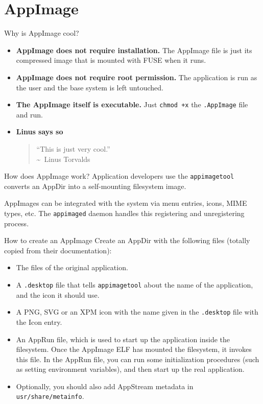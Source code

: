 \documentclass{lug}
\begin{document}
\section{AppImage}
\begin{frame}{Why is AppImage cool?}
    \begin{itemize}
        \item \textbf{AppImage does not require installation.} The AppImage file
            is just its compressed image that is mounted with FUSE when it runs.
        \item \textbf{AppImage does not require root permission.} The
            application is run as the user and the base system is left
            untouched.
        \item \textbf{The AppImage itself is executable.} Just \texttt{chmod +x}
            the \texttt{.AppImage} file and run.
        \item \textbf{Linus says so}
            \begin{quote}
                ``This is just very cool.''\\
                \hspace*{0.5in}\textasciitilde\ Linus Torvalds
            \end{quote}
    \end{itemize}
\end{frame}

\begin{frame}{How does AppImage work?}
    Application developers use the \texttt{appimagetool} converts an AppDir into
    a self-mounting filesystem image.

    AppImages can be integrated with the system via menu entries, icons, MIME
    types, etc. The \texttt{appimaged} daemon handles this registering and
    unregistering process.
\end{frame}

\begin{frame}{How to create an AppImage}
    Create an AppDir with the following files (totally copied from their
    documentation):
    \begin{itemize}
        \item The files of the original application.
        \item A \texttt{.desktop} file that tells \texttt{appimagetool}
            about the name of the application, and the icon it should
            use.
        \item A PNG, SVG or an XPM icon with the name given in the
            \texttt{.desktop} file with the Icon entry.
        \item An AppRun file, which is used to start up the application
            inside the filesystem. Once the AppImage ELF has mounted the
            filesystem, it invokes this file. In the AppRun file, you
            can run some initialization procedures (such as setting
            environment variables), and then start up the real
            application.
        \item Optionally, you should also add AppStream metadata in
            \texttt{usr/share/metainfo}.
    \end{itemize}
\end{frame}
\end{document}
